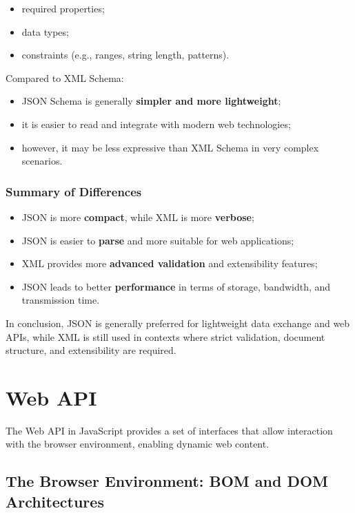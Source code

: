\documentclass{scrbook}
\begin{document}
	\begin{itemize}
		\item required properties;
		\item data types;
		\item constraints (e.g., ranges, string length, patterns).
	\end{itemize}
	
	Compared to XML Schema:
	
	\begin{itemize}
		\item JSON Schema is generally \textbf{simpler and more lightweight};
		\item it is easier to read and integrate with modern web technologies;
		\item however, it may be less expressive than XML Schema in very complex scenarios.
	\end{itemize}
	
	\subsection{Summary of Differences}
	
	\begin{itemize}
		\item JSON is more \textbf{compact}, while XML is more \textbf{verbose};
		\item JSON is easier to \textbf{parse} and more suitable for web applications;
		\item XML provides more \textbf{advanced validation} and extensibility features;
		\item JSON leads to better \textbf{performance} in terms of storage, bandwidth, and transmission time.
	\end{itemize}
	
	In conclusion, JSON is generally preferred for lightweight data exchange and web APIs, while XML is still used in contexts where strict validation, document structure, and extensibility are required.
	
	\chapter{Web API}
	
	The Web API in JavaScript provides a set of interfaces that allow interaction with the browser environment, enabling dynamic web content.
	
	\section{The Browser Environment: BOM and DOM Architectures}
	
\end{document}
